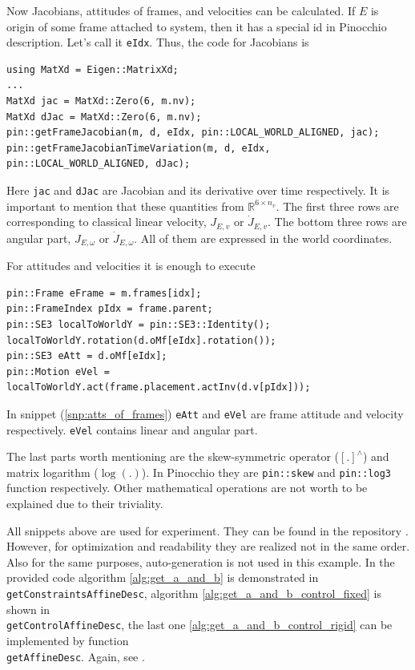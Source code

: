Now Jacobians, attitudes of frames, and velocities can be calculated. If $E$ is 
origin of some frame attached to system, then it has a special id in Pinocchio 
description. Let's call it \texttt{eIdx}. Thus, the code for Jacobians is

\begin{lstlisting}[caption={Jacobians}, label=snp:jacs]
using MatXd = Eigen::MatrixXd;
...
MatXd jac = MatXd::Zero(6, m.nv);
MatXd dJac = MatXd::Zero(6, m.nv);
pin::getFrameJacobian(m, d, eIdx, pin::LOCAL_WORLD_ALIGNED, jac);
pin::getFrameJacobianTimeVariation(m, d, eIdx, pin::LOCAL_WORLD_ALIGNED, dJac);
\end{lstlisting}

Here \texttt{jac} and \texttt{dJac} are Jacobian and its derivative over time 
respectively. It is important to mention that these quantities from 
$\mathbb{R}^{6 \times n_v}$. The first three rows are corresponding to 
classical linear velocity, $J_{E,v}$ or $\dot{J}_{E,v}$. The bottom three rows are 
angular part, $J_{E,\omega}$ or $\dot{J}_{E,\omega}$. All of them are expressed 
in the world coordinates.

For attitudes and velocities it is enough to execute

\begin{lstlisting}[caption={Attitudes of frames}, label=snp:atts_of_frames]
pin::Frame eFrame = m.frames[idx];
pin::FrameIndex pIdx = frame.parent;
pin::SE3 localToWorldY = pin::SE3::Identity();
localToWorldY.rotation(d.oMf[eIdx].rotation());
pin::SE3 eAtt = d.oMf[eIdx]; 
pin::Motion eVel = localToWorldY.act(frame.placement.actInv(d.v[pIdx]));
\end{lstlisting}

In snippet (\ref{snp:atts_of_frames}) \texttt{eAtt} and \texttt{eVel} are 
frame attitude and velocity respectively. \texttt{eVel} contains linear and 
angular part.

The last parts worth mentioning are the skew-symmetric operator ($[.]^{\wedge}$) 
and matrix logarithm ($\log (.)$). In Pinocchio they are \texttt{pin::skew} and 
\texttt{pin::log3} function respectively. Other mathematical operations are not 
worth to be explained due to their triviality. 

All snippets above are used for experiment. They can be found in the repository 
\cite{experimentsRepo}. However, for optimization and readability they 
are realized not in the same order. Also for the same purposes, auto-generation is 
not used in this example. In the provided code algorithm 
\ref{alg:get_a_and_b} is demonstrated in \texttt{getConstraintsAffineDesc}, 
algorithm \ref{alg:get_a_and_b_control_fixed} is shown in \\
\texttt{getControlAffineDesc}, the last one \ref{alg:get_a_and_b_control_rigid} 
can be implemented by function \\ \texttt{getAffineDesc}. Again, see 
\cite{experimentsRepo}.

